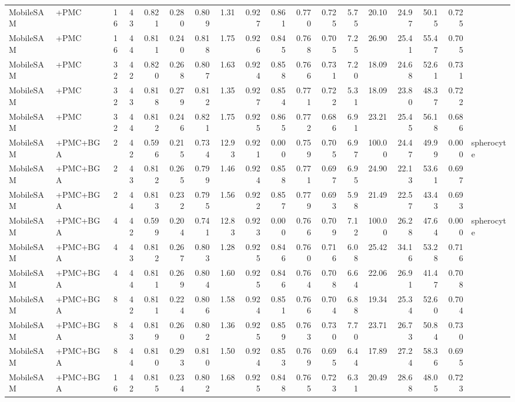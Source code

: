 \documentclass[10pt]{article}
\begin{document}
\begin{landscape}
{\begin{longtable}{l l r r r r r r r r r r r r r r r l}
MobileSAM & +PMC & 16 & 43 & 0.821 & 0.280 & 0.809 & 1.31 & 0.927 & 0.861 & 0.770 & 0.725 & 5.75 & 20.10 & 24.97 & 50.15 & 0.725 &  \\
MobileSAM & +PMC & 16 & 44 & 0.811 & 0.240 & 0.818 & 1.75 & 0.926 & 0.845 & 0.768 & 0.705 & 7.25 & 26.90 & 25.41 & 55.47 & 0.705 &  \\
MobileSAM & +PMC & 32 & 42 & 0.820 & 0.268 & 0.807 & 1.63 & 0.924 & 0.858 & 0.766 & 0.731 & 7.20 & 18.09 & 24.68 & 52.61 & 0.731 &  \\
MobileSAM & +PMC & 32 & 43 & 0.818 & 0.279 & 0.812 & 1.35 & 0.927 & 0.854 & 0.771 & 0.722 & 5.31 & 18.09 & 23.80 & 48.37 & 0.722 &  \\
MobileSAM & +PMC & 32 & 44 & 0.812 & 0.246 & 0.821 & 1.75 & 0.925 & 0.865 & 0.772 & 0.686 & 6.91 & 23.21 & 25.45 & 56.18 & 0.686 &  \\
MobileSAM & +PMC+BGA & 2 & 42 & 0.596 & 0.215 & 0.734 & 12.93 & 0.921 & 0.000 & 0.759 & 0.705 & 6.97 & 100.00 & 24.47 & 49.99 & 0.000 & spherocyte \\
MobileSAM & +PMC+BGA & 2 & 43 & 0.812 & 0.265 & 0.799 & 1.46 & 0.924 & 0.858 & 0.771 & 0.697 & 6.95 & 24.90 & 22.13 & 53.61 & 0.697 &  \\
MobileSAM & +PMC+BGA & 2 & 44 & 0.813 & 0.232 & 0.795 & 1.56 & 0.922 & 0.857 & 0.779 & 0.693 & 5.98 & 21.49 & 22.57 & 43.43 & 0.693 &  \\
MobileSAM & +PMC+BGA & 4 & 42 & 0.599 & 0.204 & 0.741 & 12.83 & 0.923 & 0.000 & 0.766 & 0.709 & 7.12 & 100.00 & 26.28 & 47.64 & 0.000 & spherocyte \\
MobileSAM & +PMC+BGA & 4 & 43 & 0.812 & 0.267 & 0.803 & 1.28 & 0.925 & 0.846 & 0.760 & 0.716 & 6.08 & 25.42 & 34.16 & 53.28 & 0.716 &  \\
MobileSAM & +PMC+BGA & 4 & 44 & 0.811 & 0.269 & 0.804 & 1.60 & 0.925 & 0.846 & 0.764 & 0.708 & 6.64 & 22.06 & 26.91 & 41.47 & 0.708 &  \\
MobileSAM & +PMC+BGA & 8 & 42 & 0.811 & 0.224 & 0.806 & 1.58 & 0.924 & 0.851 & 0.766 & 0.704 & 6.88 & 19.34 & 25.34 & 52.60 & 0.704 &  \\
MobileSAM & +PMC+BGA & 8 & 43 & 0.819 & 0.260 & 0.802 & 1.36 & 0.925 & 0.859 & 0.763 & 0.730 & 7.70 & 23.71 & 26.73 & 50.84 & 0.730 &  \\
MobileSAM & +PMC+BGA & 8 & 44 & 0.810 & 0.293 & 0.810 & 1.50 & 0.924 & 0.853 & 0.769 & 0.695 & 6.44 & 17.89 & 27.24 & 58.36 & 0.695 &  \\
MobileSAM & +PMC+BGA & 16 & 42 & 0.815 & 0.234 & 0.802 & 1.68 & 0.925 & 0.848 & 0.765 & 0.723 & 6.31 & 20.49 & 28.68 & 48.05 & 0.723 &  \\

\end{longtable}}
\end{landscape}
\end{document}

